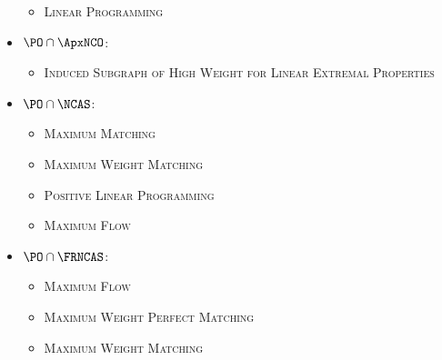 \documentclass{article}
\begin{document}
\begin{itemize}
\begin{itemize}
  \item \textsc{Linear Programming}
  \end{itemize}
\item $\PO \cap \ApxNCO$:
  \begin{itemize}
  \item \textsc{Induced Subgraph of High Weight for Linear Extremal Properties} \cite{dsst97}
  \end{itemize}
\item $\PO \cap \NCAS$:
  \begin{itemize}
  \item \textsc{Maximum Matching} \cite[Theorem~5.2.1]{dsst97}
  \item \textsc{Maximum Weight Matching} \cite[Theorem~5.2.2]{dsst97}
  \item \textsc{Positive Linear Programming} \cite[Theorem~5.1.11]{dsst97} \cite{tx98}
  \item \textsc{Maximum Flow} \cite[Theorem~5.2.2]{dsst97}
  \end{itemize}
\item $\PO \cap \FRNCAS$:
  \begin{itemize}
  \item \textsc{Maximum Flow} \cite[Theorem~4.5.2]{dsst97}
  \item \textsc{Maximum Weight Perfect Matching} \cite[Theorem~4.5.2]{dsst97}
  \item \textsc{Maximum Weight Matching} \cite[Theorem~4.5.2]{dsst97}
  \end{itemize}
\end{itemize}

\printbibliography
\end{document}

